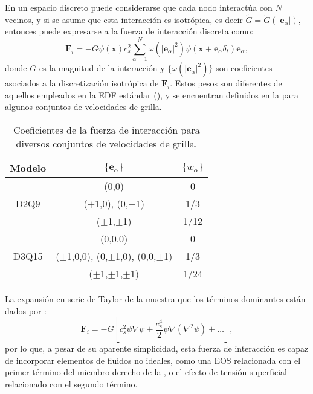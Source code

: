 En un espacio discreto puede considerarse que cada nodo interact\'ua con $N$ vecinos, y si se asume que esta interacci\'on es isotr\'opica, es decir $\tilde{G} = \tilde{G}(|\bm{e}_{\alpha}|)$, entonces puede expresarse a la fuerza de interacci\'on discreta como:
\begin{equation}
	\bm{F}_i = -G\psi(\bm{x})c_s^2 \sum_{\alpha=1}^N \omega(|\bm{e}_{\alpha}|^2)\psi(\bm{x}+\bm{e}_{\alpha}\delta_t)\bm{e}_{\alpha},
	\label{eq:f_int}
\end{equation}
donde $G$  es la magnitud de la interacci\'on y $\{\omega(|\bm{e}_{\alpha}|^2)\}$ son coeficientes asociados a la discretizaci\'on isotr\'opica de $\bm{F}_i$. Estos pesos son diferentes de aquellos empleados en la EDF est\'andar (), y se encuentran definidos en la  para algunos conjuntos de velocidades de grilla.

\begin{table}[ht]
	\centering
    \begin{tabular}{c c c}
	    \toprule
        \bf Modelo & $\{\bm{e}_{\alpha}\}$ & $\{w_{\alpha}\}$  \\
        \midrule
        \multirow{3}{*}{D2Q9} & (0,0) & 0 \\
                              & ($\pm$1,0), (0,$\pm$1) & 1/3\\
                              & ($\pm$1,$\pm$1) & 1/12  \\                              
        \midrule
        \multirow{3}{*}{D3Q15} & (0,0,0) & 0 \\
                               & ($\pm$1,0,0), (0,$\pm$1,0), (0,0,$\pm$1) & 1/3   \\
                               & ($\pm$1,$\pm$1,$\pm$1) & 1/24  \\
        \bottomrule
	\end{tabular}
	\caption{Coeficientes de la fuerza de interacci\'on para diversos conjuntos de velocidades de grilla.}
	\label{tab:coef_fza}
\end{table} 


La expansi\'on en serie de Taylor de la  muestra que los t\'erminos dominantes est\'an dados por \cite{shan_pressure_2008}:
\begin{equation}
	\bm{F}_i=-G\left[ c_s^2 \psi \nabla \psi + \dfrac{c_s^4}{2} \psi \nabla (\nabla^2 \psi)  + \ldots \right],
	\label{eq:f_int_taylor}
\end{equation}
por lo que, a pesar de su aparente simplicidad, esta fuerza de interacci\'on es capaz de incorporar elementos de fluidos no ideales, como una EOS relacionada con el primer t\'ermino del miembro derecho de la , o el efecto de tensi\'on superficial relacionado con el segundo t\'ermino.



